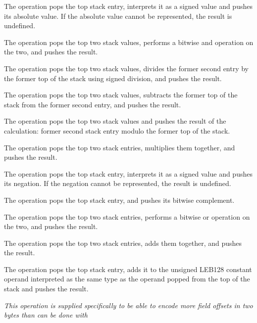 \begin{enumerate}[1. ]
\itembfnl{\DWOPabsTARG}
The \DWOPabsNAME{} operation pops the top stack entry, interprets
it as a signed value and pushes its absolute value. If the
absolute value cannot be represented, the result is undefined.

\itembfnl{\DWOPandTARG}
The \DWOPandNAME{} operation pops the top two stack values, performs
a bitwise and operation on the two, and pushes the result.

\itembfnl{\DWOPdivTARG}
The \DWOPdivNAME{} operation pops the top two stack values, divides the former second entry by
the former top of the stack using signed division, and pushes the result.

\itembfnl{\DWOPminusTARG}
The \DWOPminusNAME{} operation pops the top two stack values, subtracts the former top of the
stack from the former second entry, and pushes the result.

\itembfnl{\DWOPmodTARG}
The \DWOPmodNAME{} operation pops the top two stack values and pushes the result of the
calculation: former second stack entry modulo the former top of the stack.

\itembfnl{\DWOPmulTARG}
The \DWOPmulNAME{} operation pops the top two stack entries, multiplies them together, and
pushes the result.

\itembfnl{\DWOPnegTARG}
The \DWOPnegNAME{} operation pops the top stack entry, interprets
it as a signed value and pushes its negation. If the negation
cannot be represented, the result is undefined.

\itembfnl{\DWOPnotTARG}
The \DWOPnotNAME{} operation pops the top stack entry, and pushes
its bitwise complement.

\itembfnl{\DWOPorTARG}
The \DWOPorNAME{} operation pops the top two stack entries, performs
a bitwise or operation on the two, and pushes the result.

\itembfnl{\DWOPplusTARG}
The \DWOPplusNAME{} operation pops the top two stack entries,
adds them together, and pushes the result.

\itembfnl{\DWOPplusuconstTARG}
The \DWOPplusuconstNAME{} operation pops the top stack entry,
adds it to the unsigned LEB128
constant operand 
interpreted as the same type as the operand popped from the 
top of the stack and pushes the result.

\textit{This operation is supplied specifically to be
able to encode more field offsets in two bytes than can be
done with
}


\end{enumerate}
